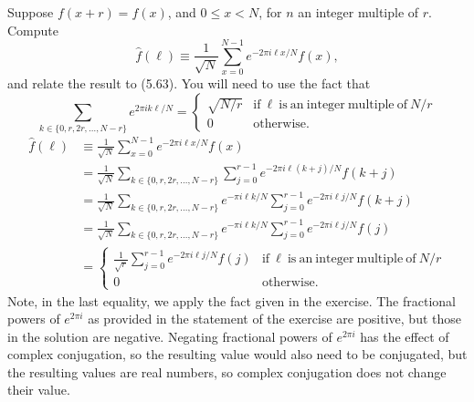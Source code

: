  Suppose $f(x+r) = f(x)$, and $0\leq x< N$, for $n$ an integer multiple of $r$.  Compute $$\hat{f}(\ell) \equiv \frac{1}{\sqrt{N}}\sum_{x=0}^{N-1}e^{-2\pi i\ell x/N}f(x),$$ and relate the result to (5.63). You will need to use the fact that $$\sum_{k\in\{0,r,2r,\ldots,N-r\}}e^{2\pi ik\ell/N} = \begin{cases} \sqrt{N/r} & \mathrm{if}\ \ell\ \mathrm{is\ an\ integer\ multiple\ of}\ N/r \\ 0 & \mathrm{otherwise.}\end{cases}$$
\Soln
\begin{align*} \hat{f}(\ell) &\equiv \frac{1}{\sqrt{N}}\sum_{x=0}^{N-1}e^{-2\pi i\ell x/N}f(x) \tag{definition}\\
&= \frac{1}{\sqrt{N}}\sum_{k\in\{0,r,2r,\ldots,N-r\}}\sum_{j=0}^{r-1}e^{-2\pi i\ell (k+j)/N}f(k+j) \tag{separate summation}\\
&= \frac{1}{\sqrt{N}}\sum_{k\in\{0,r,2r,\ldots,N-r\}}e^{-\pi i\ell k/N}\sum_{j=0}^{r-1}e^{-2\pi i\ell j/N}f(k+j) \tag{group contributions of $k$ to scalar} \\
&= \frac{1}{\sqrt{N}}\sum_{k\in\{0,r,2r,\ldots,N-r\}}e^{-\pi i\ell k/N}\sum_{j=0}^{r-1}e^{-2\pi i\ell j/N}f(j) \tag{$f$ has period $r$} \\
&= \begin{cases}
 \frac{1}{\sqrt{r}}\sum_{j=0}^{r-1}e^{-2\pi i\ell j/N}f(j) & \mathrm{if}\ \ell\ \mathrm{is\ an\ integer\ multiple\ of}\ N/r \\ 0 & \mathrm{otherwise.}\end{cases}
%
\end{align*}
Note, in the last equality, we apply the fact given in the exercise.  The fractional powers of $e^{2\pi i}$ as provided in the statement of the exercise are positive, but those in the solution are negative.  Negating fractional powers of $e^{2\pi i}$ has the effect of complex conjugation, so the resulting value would also need to be conjugated, but the resulting values are real numbers, so complex conjugation does not change their value.


